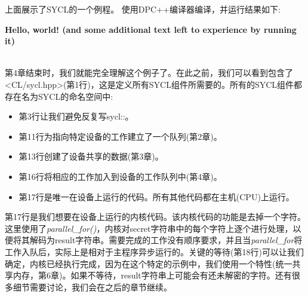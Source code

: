 上面展示了SYCL的一个例程。 使用DPC++编译器编译，并运行结果如下:\par 

\textbf{Hello, world! (and some additional text left to experience by running it)} \par
\hspace*{\fill} \\ %

第4章结束时，我们就能完全理解这个例子了。在此之前，我们可以看到包含了<CL/sycl.hpp>(第1行)，这是定义所有SYCL组件所需要的。所有的SYCL组件都存在名为SYCL的命名空间中:\par

\begin{itemize}
	\item 第3行让我们避免反复写sycl::。
	\item 第11行为指向特定设备的工作建立了一个队列(第2章)。
	\item 第13行创建了设备共享的数据(第3章)。
	\item 第16行将相应的工作加入到设备的工作队列中(第4章)。
	\item 第17行是唯一在设备上运行的代码。所有其他代码都在主机(CPU)上运行。
\end{itemize}

第17行是我们想要在设备上运行的内核代码。该内核代码的功能是去掉一个字符。这里使用了\textit{parallel\_for()}，内核对secret字符串中的每个字符上逐个进行处理，以便将其解码为result字符串。需要完成的工作没有顺序要求，并且当\textit{parallel\_for}将工作入队后，实际上是相对于主程序异步运行的。关键的等待(第18行)可以让我们确定，内核已经执行完成，因为在这个特定的示例中，我们使用一个特性(统一共享内存，第6章)。如果不等待，result字符串上可能会有还未解密的字符。还有很多细节需要讨论，我们会在之后的章节继续。\par
